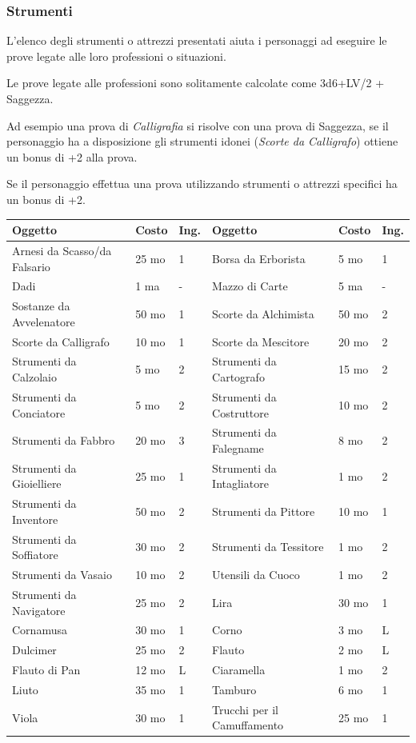 \begin{multicols}{2}

\subsubsection{Strumenti}

L'elenco degli strumenti o attrezzi presentati aiuta i personaggi ad eseguire le prove legate alle loro professioni o situazioni.

Le prove legate alle professioni sono solitamente calcolate come 3d6+LV/2 + Saggezza.

Ad esempio una prova di \emph{Calligrafia} si risolve con una prova di Saggezza, se il personaggio ha a disposizione gli strumenti idonei (\emph{Scorte da Calligrafo}) ottiene un bonus di +2 alla prova.

Se il personaggio effettua una prova utilizzando strumenti o attrezzi specifici ha un bonus di +2.

\end{multicols}

\medskip

\begin{tabularx}{0.95\textwidth}{llX|llX}
\textbf{Oggetto}&\textbf{Costo}&\textbf{Ing.}&\textbf{Oggetto}&\textbf{Costo}&\textbf{Ing.}\\
\toprule
Arnesi da Scasso/da Falsario&25 mo&1&Borsa da Erborista&5 mo&1\\
Dadi&1 ma&-&Mazzo di Carte&5 ma&-\\
Sostanze da Avvelenatore&50 mo&1&Scorte da Alchimista&50 mo&2\\
Scorte da Calligrafo&10 mo&1&Scorte da Mescitore&20 mo&2\\
Strumenti da Calzolaio&5 mo&2&Strumenti da Cartografo&15 mo&2\\
Strumenti da Conciatore&5 mo&2&Strumenti da Costruttore&10 mo&2\\
Strumenti da Fabbro&20 mo&3&Strumenti da Falegname&8 mo&2\\
Strumenti da Gioielliere&25 mo&1&Strumenti da Intagliatore&1 mo&2\\
Strumenti da Inventore&50 mo&2&Strumenti da Pittore&10 mo&1\\
Strumenti da Soffiatore&30 mo&2&Strumenti da Tessitore&1 mo&2\\
Strumenti da Vasaio&10 mo&2&Utensili da Cuoco&1 mo&2\\
Strumenti da Navigatore&25 mo&2&Lira&30 mo&1\\
Cornamusa&30 mo&1&Corno&3 mo&L\\
Dulcimer&25 mo&2&Flauto&2 mo&L\\
Flauto di Pan&12 mo&L&Ciaramella &1 mo &2\\
Liuto&35 mo&1&Tamburo&6 mo&1\\
Viola&30 mo&1&Trucchi per il Camuffamento&25 mo&1\\
\end{tabularx}

